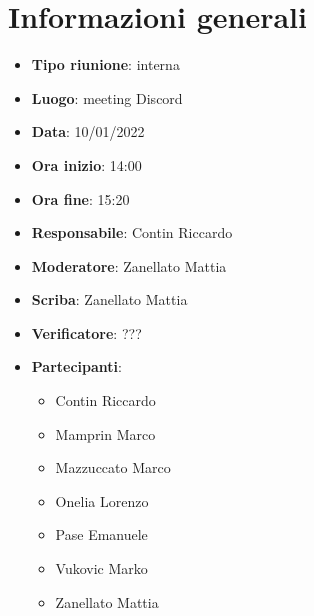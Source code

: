 \section{Informazioni generali}
\begin{itemize}
  \item \textbf{Tipo riunione}: interna
  \item \textbf{Luogo}: meeting Discord
  \item \textbf{Data}: 10/01/2022
  \item \textbf{Ora inizio}: 14:00
  \item \textbf{Ora fine}: 15:20
  \item \textbf{Responsabile}: Contin Riccardo
  \item \textbf{Moderatore}: Zanellato Mattia
  \item \textbf{Scriba}: Zanellato Mattia
  \item \textbf{Verificatore}: ???
  \item \textbf{Partecipanti}:
  \begin{itemize}
    \item Contin Riccardo
    \item Mamprin Marco
    \item Mazzuccato Marco
    \item Onelia Lorenzo
    \item Pase Emanuele
    \item Vukovic Marko
    \item Zanellato Mattia
  \end{itemize}
\end{itemize}
